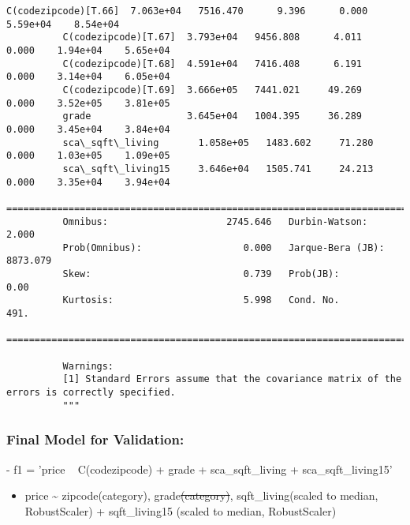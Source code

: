 \documentclass[11pt]{article}
\providecommand{\tightlist}{%
      \setlength{\itemsep}{0pt}\setlength{\parskip}{0pt}}
\newenvironment{Shaded}{}{}
\newcommand{\StringTok}[1]{\textcolor[rgb]{0.25,0.44,0.63}{{#1}}}
\newcommand{\NormalTok}[1]{{#1}}
\newcommand{\OperatorTok}[1]{\textcolor[rgb]{0.40,0.40,0.40}{{#1}}}
\begin{document}
\begin{Verbatim}[commandchars=\\\{\}]
          C(codezipcode)[T.66]  7.063e+04   7516.470      9.396      0.000    5.59e+04    8.54e+04
          C(codezipcode)[T.67]  3.793e+04   9456.808      4.011      0.000    1.94e+04    5.65e+04
          C(codezipcode)[T.68]  4.591e+04   7416.408      6.191      0.000    3.14e+04    6.05e+04
          C(codezipcode)[T.69]  3.666e+05   7441.021     49.269      0.000    3.52e+05    3.81e+05
          grade                 3.645e+04   1004.395     36.289      0.000    3.45e+04    3.84e+04
          sca\_sqft\_living       1.058e+05   1483.602     71.280      0.000    1.03e+05    1.09e+05
          sca\_sqft\_living15     3.646e+04   1505.741     24.213      0.000    3.35e+04    3.94e+04
          ==============================================================================
          Omnibus:                     2745.646   Durbin-Watson:                   2.000
          Prob(Omnibus):                  0.000   Jarque-Bera (JB):             8873.079
          Skew:                           0.739   Prob(JB):                         0.00
          Kurtosis:                       5.998   Cond. No.                         491.
          ==============================================================================
          
          Warnings:
          [1] Standard Errors assume that the covariance matrix of the errors is correctly specified.
          """
\end{Verbatim}
            
    \hypertarget{final-model-for-validation}{%
\subsubsection{Final Model for
Validation:}\label{final-model-for-validation}}

\begin{Shaded}
\begin{Highlighting}[]
\OperatorTok{-}\NormalTok{ f1 }\OperatorTok{=} \StringTok{'price ~ C(codezipcode) + grade + sca_sqft_living + sca_sqft_living15'} 
\end{Highlighting}
\end{Shaded}

\begin{itemize}
\tightlist
\item
  price \textasciitilde{} zipcode(category), grade\sout{(category)},
  sqft\_living(scaled to median, RobustScaler) + sqft\_living15 (scaled
  to median, RobustScaler)
\end{itemize}
\end{document}
